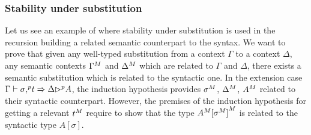 
\subsubsection{Stability under substitution}
Let us see an example of where stability under substitution is used in
the recursion building a related semantic counterpart to the syntax.
 We want to prove that given any well-typed
substitution from a context $\Gamma$ to a context $\Delta$, any semantic
contexts ${\Gamma}^M$ and ${\Delta}^M$ which are related to $\Gamma$ and
$\Delta$, there exists a semantic substitution which is related to the syntactic one.
In the extension case $\Gamma\vdash \sigma {,}^p t \Rightarrow \Delta {\rhd}^p A$, the
induction hypothesis provides ${\sigma}^M$, ${\Delta}^M$, ${A}^M$ related to
their syntactic counterpart. However, the premises of the induction hypothesis
for getting a relevant ${t}^M$
require to show that the type ${A}^M{[{\sigma}^M]}^M$ is
related to the syntactic type $A[\sigma]$.


